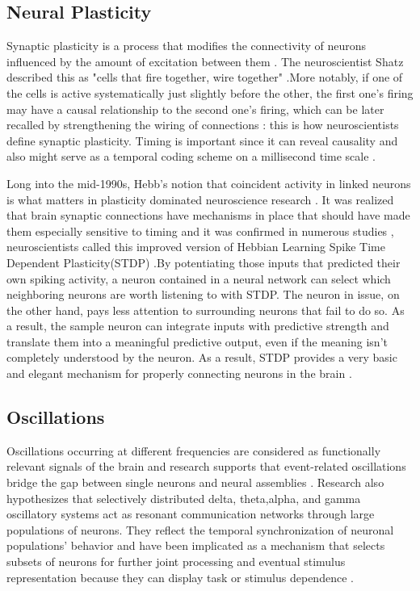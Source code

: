 \documentclass[12pt]{report}
\begin{document}
\subsection{Neural Plasticity}
Synaptic plasticity is a process that modifies the connectivity of neurons influenced by the amount of excitation between them . The neuroscientist  Shatz described this as "cells that fire together, wire together" \cite{shatz1992}.More notably, if one of the cells is active systematically just slightly before the other, the first one's firing may have a causal relationship to the second one's firing, which can be later recalled by strengthening the wiring of connections : this is how neuroscientists define synaptic plasticity. Timing is important since it can reveal causality and also might serve as a temporal coding scheme on a millisecond time scale .

Long into the mid-1990s, Hebb's notion that coincident activity in linked neurons is what matters in plasticity dominated neuroscience research . It was realized that brain synaptic connections have mechanisms in place that should have made them especially sensitive to timing and it was confirmed in numerous studies \cite{markram1995}\cite{markram1997}\cite{Gerstner1996}, neuroscientists called this improved version of Hebbian Learning Spike Time Dependent Plasticity(STDP) .By potentiating those inputs that predicted their own spiking activity, a neuron contained in a neural network can select which neighboring neurons are worth listening to with STDP. The neuron in issue, on the other hand, pays less attention to surrounding neurons that fail to do so. As a result, the sample neuron can integrate inputs with predictive strength and translate them into a meaningful predictive output, even if the meaning isn't completely understood by the neuron. As a result, STDP provides a very basic and elegant mechanism for properly connecting neurons in the brain \cite{Markram2012} .

\subsection{Oscillations}
Oscillations occurring at different frequencies are considered as functionally relevant signals of the brain and research supports that event-related oscillations bridge the gap between single neurons and neural assemblies \cite{Basar2000}. Research also hypothesizes that selectively  distributed delta, theta,alpha, and gamma oscillatory systems act as resonant communication networks through large populations of neurons. They reflect the temporal synchronization of neuronal populations' behavior and have been implicated as a mechanism that selects subsets of neurons for further joint processing and eventual stimulus representation because they can display task or stimulus dependence \cite{Singer1995} \cite{Singer1999}.
\end{document}
